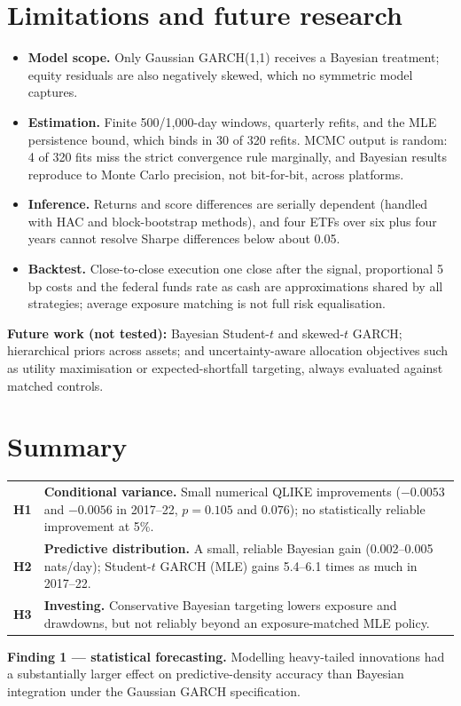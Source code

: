\documentclass[11pt]{article}
\newcommand{\pbox}[1]{\par\smallskip\noindent\colorbox{boxbg}{\parbox{\dimexpr\textwidth-2\fboxsep}{#1}}\par\smallskip}
\begin{document}
\section{Limitations and future research}
\begin{itemize}
\item \textbf{Model scope.} Only Gaussian GARCH(1,1) receives a Bayesian treatment; equity residuals are also
negatively skewed, which no symmetric model captures.
\item \textbf{Estimation.} Finite 500/1{,}000-day windows, quarterly refits, and the MLE persistence bound, which binds in
30 of 320 refits. MCMC output is random: 4 of 320 fits miss the strict convergence rule marginally, and Bayesian
results reproduce to Monte Carlo precision, not bit-for-bit, across platforms.
\item \textbf{Inference.} Returns and score differences are serially dependent (handled with HAC and block-bootstrap
methods), and four ETFs over six plus four years cannot resolve Sharpe differences below about 0.05.
\item \textbf{Backtest.} Close-to-close execution one close after the signal, proportional 5 bp costs and the federal
funds rate as cash are approximations shared by all strategies; average exposure matching is not full risk equalisation.
\end{itemize}
\textbf{Future work (not tested):} Bayesian Student-$t$ and skewed-$t$ GARCH; hierarchical priors across assets; and
uncertainty-aware allocation objectives such as utility maximisation or expected-shortfall targeting, always evaluated
against matched controls.

\section{Summary}
\pbox{\begin{tabular}{@{}l@{\;\;}p{}@{}}
\textbf{H1} & \textbf{Conditional variance.} Small numerical QLIKE improvements ($-0.0053$ and $-0.0056$ in 2017--22,
$p=0.105$ and $0.076$); no statistically reliable improvement at 5\%.\\[2pt]
\textbf{H2} & \textbf{Predictive distribution.} A small, reliable Bayesian gain (0.002--0.005 nats/day); Student-$t$
GARCH (MLE) gains 5.4--6.1 times as much in 2017--22.\\[2pt]
\textbf{H3} & \textbf{Investing.} Conservative Bayesian targeting lowers exposure and drawdowns, but not reliably beyond
an exposure-matched MLE policy.
\end{tabular}}
\textbf{Finding 1 --- statistical forecasting.} Modelling heavy-tailed innovations had a substantially larger effect on
predictive-density accuracy than Bayesian integration under the Gaussian GARCH specification.
\end{document}
